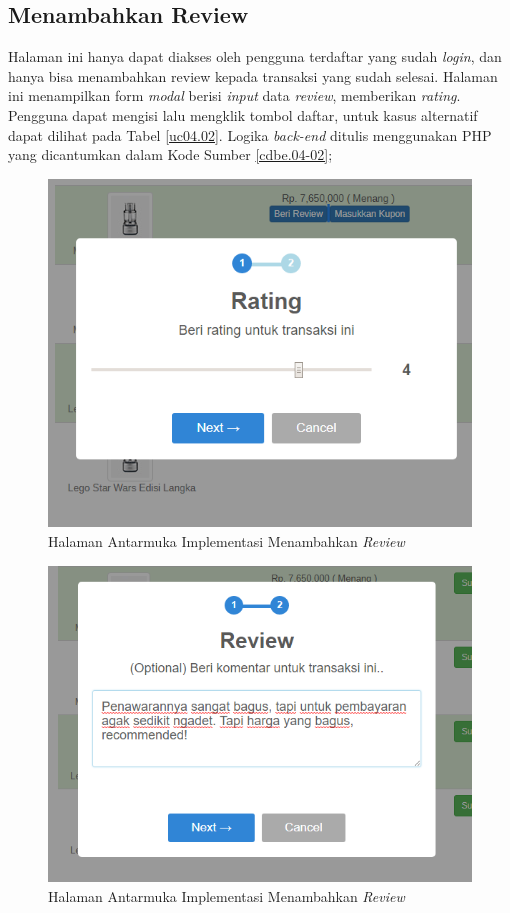 \subsection{Menambahkan Review}
    Halaman ini hanya dapat diakses oleh pengguna terdaftar yang sudah \textit{login}, dan hanya bisa menambahkan review kepada transaksi yang sudah selesai. Halaman ini menampilkan form \textit{modal} berisi \textit{input} data \textit{review}, memberikan \textit{rating}. Pengguna dapat mengisi lalu mengklik tombol daftar, untuk kasus alternatif dapat dilihat pada Tabel \ref{uc04.02}. Logika \textit{back-end} ditulis menggunakan PHP yang dicantumkan dalam Kode Sumber \ref{cdbe.04-02};

\begin{figure}[H]
\centering
\includegraphics[width=.85\textwidth]{images/bab4/ui/04-02a.png}
\caption{Halaman Antarmuka Implementasi Menambahkan \textit{Review}}
\label{ui.04-02a}
\end{figure}

\begin{figure}[H]
\centering
\includegraphics[width=.85\textwidth]{images/bab4/ui/04-02b.png}
\caption{Halaman Antarmuka Implementasi Menambahkan \textit{Review}}
\label{ui.04-02b}
\end{figure}

